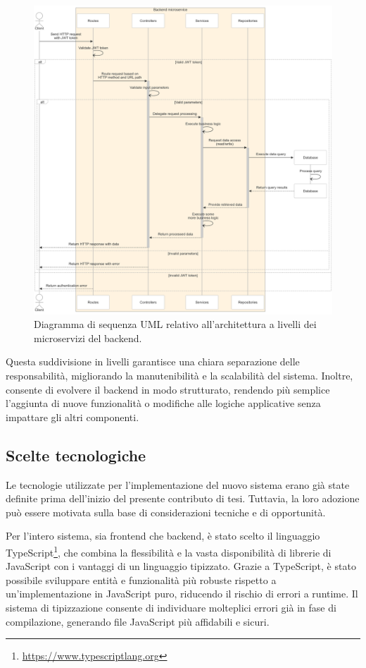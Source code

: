 \begin{figure}
  \centering
  \includegraphics[width=1\textwidth]{figures/microservice-architecture.png}
  \caption{Diagramma di sequenza UML relativo all'architettura a livelli dei microservizi del backend.}
  \label{fig:microservice-architecture}
\end{figure}

Questa suddivisione in livelli garantisce una chiara separazione delle responsabilità, migliorando la manutenibilità e la scalabilità del sistema. Inoltre, consente di evolvere il backend in modo strutturato, rendendo più semplice l'aggiunta di nuove funzionalità o modifiche alle logiche applicative senza impattare gli altri componenti.

\subsection{Scelte tecnologiche}
Le tecnologie utilizzate per l'implementazione del nuovo sistema erano già state definite prima dell'inizio del presente contributo di tesi. Tuttavia, la loro adozione può essere motivata sulla base di considerazioni tecniche e di opportunità.

Per l'intero sistema, sia frontend che backend, è stato scelto il linguaggio TypeScript\footnote{\url{https://www.typescriptlang.org}}, che combina la flessibilità e la vasta disponibilità di librerie di JavaScript con i vantaggi di un linguaggio tipizzato. Grazie a TypeScript, è stato possibile sviluppare entità e funzionalità più robuste rispetto a un'implementazione in JavaScript puro, riducendo il rischio di errori a runtime. Il sistema di tipizzazione consente di individuare molteplici errori già in fase di compilazione, generando file JavaScript più affidabili e sicuri.

